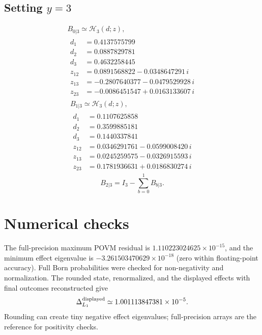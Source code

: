 \documentclass[11pt]{article}
\begin{document}
\subsection*{Setting $y=3$}
\[
\begin{gathered}
B_{0|3}\simeq\mathcal H_3(d;z),\\[3pt]
\begin{aligned}
d_1&=0.4137575799 \\
d_2&=0.0887829781 \\
d_3&=0.4632258445 \\
z_{12}&=0.0891568822-0.0348647291\,i \\
z_{13}&=-0.2807640377-0.0479529928\,i \\
z_{23}&=-0.0086451547+0.0163133607\,i
\end{aligned}
\end{gathered}
\]
\[
\begin{gathered}
B_{1|3}\simeq\mathcal H_3(d;z),\\[3pt]
\begin{aligned}
d_1&=0.1107625858 \\
d_2&=0.3599885181 \\
d_3&=0.1440337841 \\
z_{12}&=0.0346291761-0.0599008420\,i \\
z_{13}&=0.0245259575-0.0326915593\,i \\
z_{23}&=0.1781936631+0.0186830274\,i
\end{aligned}
\end{gathered}
\]
\[
B_{2|3}=I_3-\sum_{b=0}^1B_{b|3}.
\]
\section{Numerical checks}
The full-precision maximum POVM residual is $1.110223024625\times10^{-15}$,
and the minimum effect eigenvalue is $-3.261503470629\times10^{-18}$
(zero within floating-point accuracy). Full Born probabilities were checked
for non-negativity and normalization. The rounded state, renormalized, and
the displayed effects with final outcomes reconstructed give
\[
\Delta_{L_1}^{\rm displayed}\simeq 1.001113847381\times10^{-5}.
\]
Rounding can create tiny negative effect eigenvalues; full-precision
arrays are the reference for positivity checks.
\end{document}

